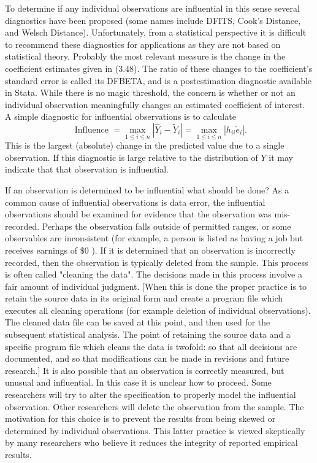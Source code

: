 \documentclass[10pt]{article}
\begin{document}
To determine if any individual observations are influential in this sense several diagnostics have been proposed (some names include DFITS, Cook's Distance, and Welsch Distance). Unfortunately, from a statistical perspective it is difficult to recommend these diagnostics for applications as they are not based on statistical theory. Probably the most relevant measure is the change in the coefficient estimates given in (3.48). The ratio of these changes to the coefficient's standard error is called its DFBETA, and is a postestimation diagnostic available in Stata. While there is no magic threshold, the concern is whether or not an individual observation meaningfully changes an estimated coefficient of interest. A simple diagnostic for influential observations is to calculate
$$
\text { Influence }=\max _{1 \leq i \leq n}\left|\widehat{Y}_{i}-\widetilde{Y}_{i}\right|=\max _{1 \leq i \leq n}\left|h_{i i} \widetilde{e}_{i}\right| .
$$
This is the largest (absolute) change in the predicted value due to a single observation. If this diagnostic is large relative to the distribution of $Y$ it may indicate that that observation is influential.

If an observation is determined to be influential what should be done? As a common cause of influential observations is data error, the influential observations should be examined for evidence that the observation was mis-recorded. Perhaps the observation falls outside of permitted ranges, or some observables are inconsistent (for example, a person is listed as having a job but receives earnings of $\$ 0$ ). If it is determined that an observation is incorrectly recorded, then the observation is typically deleted from the sample. This process is often called "cleaning the data". The decisions made in this process involve a fair amount of individual judgment. [When this is done the proper practice is to retain the source data in its original form and create a program file which executes all cleaning operations (for example deletion of individual observations). The cleaned data file can be saved at this point, and then used for the subsequent statistical analysis. The point of retaining the source data and a specific program file which cleans the data is twofold: so that all decisions are documented, and so that modifications can be made in revisions and future research.] It is also possible that an observation is correctly measured, but unusual and influential. In this case it is unclear how to proceed. Some researchers will try to alter the specification to properly model the influential observation. Other researchers will delete the observation from the sample. The motivation for this choice is to prevent the results from being skewed or determined by individual observations. This latter practice is viewed skeptically by many researchers who believe it reduces the integrity of reported empirical results.
\end{document}
